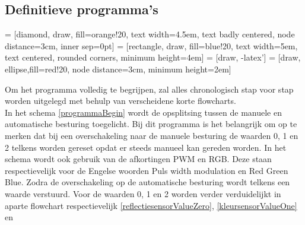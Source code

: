 \documentclass[a4paper,twoside,kulak]{kulakreport} %
\begin{document}

\subsection{Definitieve programma's}

 = [diamond, draw, fill=orange!20, text width=4.5em, text badly centered, node distance=3cm, inner sep=0pt]
 = [rectangle, draw, fill=blue!20, text width=5em, text centered, rounded corners, minimum height=4em]
 = [draw, -latex']
 = [draw, ellipse,fill=red!20, node distance=3cm,
minimum height=2em]


Om het programma volledig te begrijpen, zal alles chronologisch stap voor stap worden uitgelegd met behulp van verscheidene korte flowcharts. \\

In het schema \ref{programmaBegin} wordt de opsplitsing tussen de manuele en automatische besturing toegelicht. Bij dit programma is het belangrijk om op te merken dat bij een overschakeling naar de manuele besturing de waarden 0, 1 en 2 telkens worden gereset opdat er steeds manueel kan gereden worden. %
In het schema wordt ook gebruik van de afkortingen PWM en RGB. Deze staan respectievelijk voor de Engelse woorden Puls width modulation en Red Green Blue.
Zodra de overschakeling op de automatische besturing wordt telkens een waarde verstuurd. Voor de waarden 0, 1 en 2 worden verder verduidelijkt in aparte flowchart respectievelijk \ref{reflectiesensorValueZero}, \ref{kleursensorValueOne} en %
\end{document}
